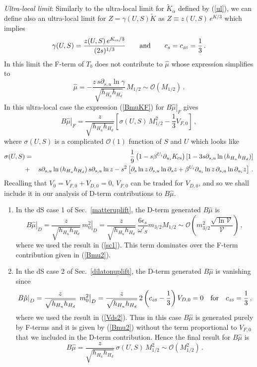 \documentclass[11pt,a4paper]{article}
\newcommand{\be}{\begin{equation}}
\newcommand{\ee}{\end{equation}}
\def\dS{{\scriptscriptstyle \rm dS}}
\newcommand\vo{{\mathcal{V}}}
\newcommand{\mc}{\mathcal}
\begin{document}
\medskip
\emph{Ultra-local limit}: Similarly to the ultra-local limit for $\tilde{K}_\alpha$ defined by (\ref{ul}), we can define also an ultra-local limit
for $Z=\gamma(U,S)\tilde{K}$ as $Z\equiv z(U,S)\,e^{K/3}$ which implies
\be
\label{fdef2}
\gamma(U,S) = \frac{z(U,S)\,e^{K_{\rm cs}/3}}{(2s)^{1/3}}\qquad \text{and}\qquad c_s=c_\dS=\frac 13\,.
\ee
In this limit the F-term of $T_b$ does not contribute to $\hat\mu$ whose expression simplifies to
\be
\label{mu2}
\hat\mu  =  - \frac{z\,s\partial_{s,u} \ln\gamma}{\sqrt{h_{H_u } h_{H_d}}}\,M_{1/2}\sim\mc{O}\left(M_{1/2}\right)\, .
\ee
In this ultra-local case the expression (\ref{BmuKF}) for $\left.B\hat\mu\right|_F$ gives
\be
\left.B\hat\mu\right|_F = \frac{z}{\sqrt{h_{H_u } h_{H_d}}}\left[\sigma(U,S) \,M_{1/2}^2-\frac 13 V_{F,0}\right]\,,
\label{Bmu2}
\ee
where $\sigma(U,S)$ is a complicated $\mc{O}(1)$ function of $S$ and $U$ which looks like
\begin{eqnarray}
\sigma(U,S) &=& \frac 19 \left(1-s\beta^{U_i}\partial_{u_i}K_{\rm cs} \right)
\left[1 - 3 s \partial_{s,u} \ln \left(h_{H_u} h_{H_d}\right)\right] \nonumber \\
&+& s \partial_{s,u} \ln \left(h_{H_u} h_{H_d}\right) s \partial_{s,u}\ln z- s^2\left[\partial_s \ln z \,\partial_{s,u} \ln \partial_s z
+\beta^{U_i} \partial_{u_i} \ln z \,\partial_{s,u} \ln \partial_{u_i} z\right]\,. \nonumber
\end{eqnarray}
Recalling that $V_0 = V_{F,0} + V_{D,0}=0$, $V_{F,0}$ can be traded for $V_{D,0}$,
and so we shall include it in our analysis of D-term contributions to $B\hat\mu$.
\begin{enumerate}
\item In the dS case 1 of Sec.~\ref{matteruplift}, the D-term generated $B\hat\mu$ is
\be
\left.B\hat\mu\right|_D = \frac{z}{\sqrt{h_{H_u} h_{H_d}}}\,\left.m_0^2\right|_D
= \frac{z}{\sqrt{h_{H_u} h_{H_d}}}\,\frac{6\epsilon_s}{\omega'_S}m_{3/2}M_{1/2}\sim  \mc{O}\left(m_{3/2}^2\frac{\sqrt{\ln\vo}}{\vo}\right)\,,
\label{bmu2dS1}
\ee
where we used the result in (\ref{sc1}). This term dominates over the F-term contribution given in (\ref{Bmu2}).

\item In the dS case 2 of Sec.~\ref{dilatonuplift}, the D-term generated $B\hat\mu$ is vanishing since
\be
\left.B\hat\mu\right|_D = \frac{z}{\sqrt{h_{H_u} h_{H_d}}}\,\left.m_0^2\right|_D
= \frac{z}{\sqrt{h_{H_u} h_{H_d}}}\,2\left(c_\dS-\frac 13\right)V_{D,0}=0 \quad\text{for}\quad c_\dS=\frac 13\,,
\label{bmu2dS2}
\ee
where we used the result in (\ref{Vds2}). Thus in this case $B\hat\mu$ is generated purely by F-terms and it is given by (\ref{Bmu2})
without the term proportional to $V_{F,0}$ that we included in the D-term contribution. Hence the final result for $B\hat\mu$ is
\be
B\hat\mu = \frac{z}{\sqrt{h_{H_u} h_{H_d}}}\,\sigma(U,S) \,M_{1/2}^2\sim\mc{O}\left(M_{1/2}^2\right)\,.
\label{Bmu22}
\ee
\end{enumerate}
\end{document}
